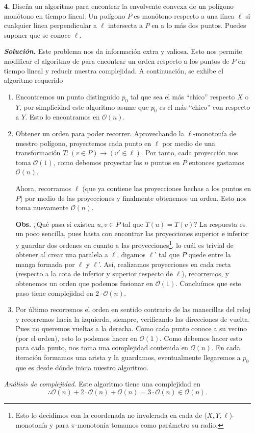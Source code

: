 \textbf{4.} Diseña un algoritmo para encontrar la envolvente convexa de un polígono monótono
en tiempo lineal. Un polígono $P$ es monótono respecto a una línea $\ell$ si cualquier
línea perpendicular a $\ell$ intersecta a $P$ en a lo más dos puntos. Puedes suponer que
se conoce $\ell$. \newline

\textbf{\textit{Solución.}} Este problema nos da información extra y valiosa. Esto nos permite modificar el algoritmo
de  para encontrar un orden respecto a los puntos de $P$ en tiempo lineal y reducir nuestra complejidad.
A continuación, se exhibe el algoritmo requerido
\begin{enumerate}
\item Encontremos un punto distinguido $p_0$ tal que sea el más ``chico'' respecto $X$ o $Y$, por simplicidad este algoritmo asume
  que $p_0$ es el más ``chico'' con respecto a $Y$. Esto lo encontramos en $\mathcal{O}(n)$.
\item Obtener un orden para poder recorrer. Aprovechando la $\ell$-monotonía de nuestro polígono, proyectemos cada punto en $\ell$
  por medio de una transformación $T: (v \in P) \rightarrow (v' \in \ell)$. Por tanto, cada proyección nos toma $\mathcal{O}(1)$,
  como debemos proyectar los $n$ puntos en $P$ entonces gastamos $\mathcal{O}(n)$. \newline
  
  Ahora, recorramos $\ell$ (que ya contiene las proyecciones hechas a los puntos en $P$) por medio de las proyecciones y finalmente
  obtenemos un orden. Esto nos toma nuevamente $\mathcal{O}(n)$.\newline
  
  \textbf{Obs.} ¿Qué pasa si existen $u, v \in P$ tal que $T(u) = T(v)$? La respuesta es un poco sencilla, pues basta con encontrar
  las proyecciones superior e inferior y guardar dos ordenes en cuanto a las proyecciones\footnote{ Esto lo decidimos con la coordenada no involcrada
  en cada de ($X, Y, \ell$)-monotonía y para $\pi$-monotonía tomamos como parámetro su radio.}, lo cuál es trivial de obtener al crear una paralela
  a $\ell$, digamos $\ell$' tal que $P$ quede entre la manga formada por $\ell$ y $\ell$'. Así, realizamos proyecciones en cada recta (respecto a la
  cota de inferior y superior respecto de $\ell$), recorremos, y obtenemos un orden que podemos fusionar en $\mathcal{O}(1)$. Concluímos que este
  paso tiene complejidad en $2 \cdot \mathcal{O}(n)$.
\item Por último recorremos el orden en sentido contrario de las manecillas del reloj y recorremos hacia la izquierda, siempre, verificando las
  direcciones de vuelta. Pues no queremos vueltas a la derecha. Como cada punto conoce a su vecino (por el orden), esto lo podemos hacer en
  $\mathcal{O}(1)$. Como debemos hacer esto para cada punto, nos toma una complejidad contenida en $\mathcal{O}(n)$. En cada iteración formamos
  una arista y la guardamos, eventualmente llegaremos a $p_0$ que es desde dónde inicia nuestro algoritmo.
\end{enumerate}

\textit{Análisis de complejidad.} Este algoritmo tiene una complejidad en
\[\therefore \mathcal{O}(n) + 2 \cdot \mathcal{O}(n) + \mathcal{O}(n) = 3 \cdot \mathcal{O}(n) \in \mathcal{O}(n).\]
